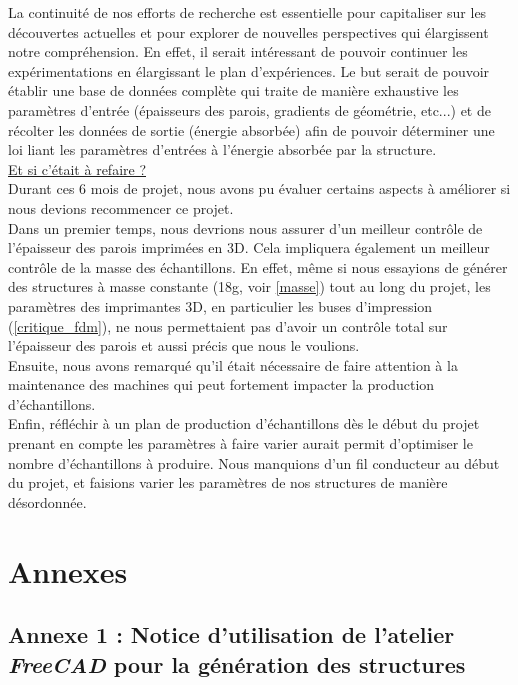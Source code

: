 \documentclass[a4paper]{article}
\begin{document}
	La continuité de nos efforts de recherche est essentielle pour capitaliser sur les découvertes actuelles et pour explorer de nouvelles perspectives qui élargissent notre compréhension. En effet, il serait intéressant de pouvoir continuer les expérimentations en élargissant le plan d'expériences. Le but serait de pouvoir établir une base de données complète qui traite de manière exhaustive les paramètres d'entrée (épaisseurs des parois, gradients de géométrie, etc...) et de récolter les données de sortie (énergie absorbée) afin de pouvoir déterminer une loi liant les paramètres d'entrées à l'énergie absorbée par la structure.\\
	
	\underline{Et si c'était à refaire ?}\\
	
	Durant ces 6 mois de projet, nous avons pu évaluer certains aspects à améliorer si nous devions recommencer ce projet.\\
	
	Dans un premier temps, nous devrions nous assurer d'un meilleur contrôle de l’épaisseur des parois imprimées en 3D. Cela impliquera également un meilleur contrôle de la masse des échantillons. En effet, même si nous essayions de générer des structures à masse constante (18g, voir \ref{masse}) tout au long du projet, les paramètres des imprimantes 3D, en particulier les buses d'impression (\ref{critique_fdm}), ne nous permettaient pas d'avoir un contrôle total sur l'épaisseur des parois et aussi précis que nous le voulions.\\
	
	Ensuite, nous avons remarqué qu'il était nécessaire de faire attention à la maintenance des machines qui peut fortement impacter la production d’échantillons.\\
	
	Enfin, réfléchir à un plan de production d’échantillons dès le début du projet prenant en compte les paramètres à faire varier aurait permit d’optimiser le nombre d’échantillons à produire. Nous manquions d'un fil conducteur au début du projet, et faisions varier les paramètres de nos structures de manière désordonnée.\\
	\newpage
	
	\section{Annexes}
	\subsection{Annexe 1 : Notice d'utilisation de l'atelier \textit{FreeCAD} pour la génération des structures}
	\label{doc_lattybrides}
	
	\newpage
	
\end{document}
